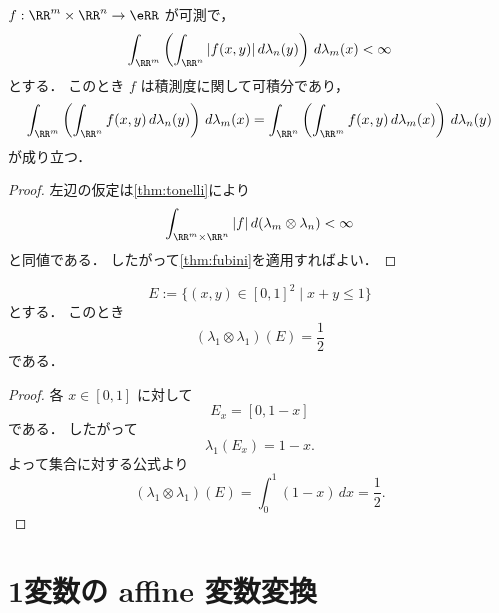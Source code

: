 \begin{corollary}[積分順序の交換]\label{cor:iterated-integral-exchange}
$f:\RR^m\times\RR^n\to\eRR$ が可測で，
\[
\int_{\RR^m}\left(\int_{\RR^n}|f(x,y)|\,d\lambda_n(y)\right)\,d\lambda_m(x)<\infty
\]
とする．
このとき $f$ は積測度に関して可積分であり，
\[
\int_{\RR^m}\left(\int_{\RR^n}f(x,y)\,d\lambda_n(y)\right)\,d\lambda_m(x)
=
\int_{\RR^n}\left(\int_{\RR^m}f(x,y)\,d\lambda_m(x)\right)\,d\lambda_n(y)
\]
が成り立つ．
\end{corollary}
\begin{proof}
左辺の仮定は\cref{thm:tonelli}により
\[
\int_{\RR^m\times\RR^n}|f|\,d(\lambda_m\otimes\lambda_n)<\infty
\]
と同値である．
したがって\cref{thm:fubini}を適用すればよい．
\end{proof}

\begin{example}[三角形の面積]
\[
E:=\{(x,y)\in[0,1]^2\mid x+y\le 1\}
\]
とする．
このとき
\[
(\lambda_1\otimes \lambda_1)(E)=\frac12
\]
である．
\end{example}
\begin{proof}
各 $x\in[0,1]$ に対して
\[
E_x=[0,1-x]
\]
である．
したがって
\[
\lambda_1(E_x)=1-x.
\]
よって集合に対する公式より
\[
(\lambda_1\otimes \lambda_1)(E)
=
\int_0^1(1-x)\,dx
=
\frac12.
\]
\end{proof}

\section{1変数の affine 変数変換}

